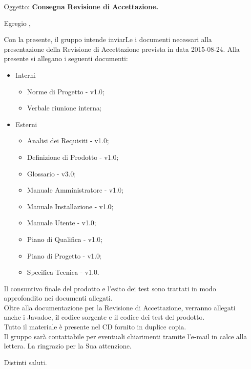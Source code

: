 \documentclass[a4paper,10pt]{letter}
\begin{document}
	
	\begin{letter}{Oggetto: \textbf{Consegna Revisione di Accettazione.}}
	\opening {Egregio \Vardanega ,}
	Con la presente, il gruppo \gruppo intende inviarLe i documenti necessari alla presentazione della Revisione di Accettazione prevista in data 2015-08-24.
	Alla presente si allegano i seguenti documenti:
			\begin{itemize}
				\item Interni
					\begin{itemize}
						\item Norme di Progetto - v1.0;
						\item Verbale riunione interna;						
					\end{itemize}
				\item Esterni
					\begin{itemize}
						\item Analisi dei Requisiti - v1.0;
						\item Definizione di Prodotto - v1.0;
						\item Glossario - v3.0;
						\item Manuale Amministratore - v1.0;
						\item Manuale Installazione - v1.0;
						\item Manuale Utente - v1.0;
						\item Piano di Qualifica - v1.0;
						\item Piano di Progetto - v1.0;
						\item Specifica Tecnica - v1.0.
					\end{itemize}
			\end{itemize} 
		Il consuntivo finale del prodotto e l’esito dei test sono trattati in modo approfondito nei documenti allegati.\\
		Oltre alla documentazione per la Revisione di Accettazione, verranno allegati anche i Javadoc, il codice sorgente e il codice dei test del prodotto.\\
		Tutto il materiale è presente nel CD fornito in duplice copia.\\
		Il gruppo sarà  contattabile per eventuali chiarimenti tramite l'e-mail in calce alla lettera. La ringrazio per la Sua attenzione.
		
		\thispagestyle{fancy}
		\closing{Distinti saluti.}

   \end{letter}
\end{document}
